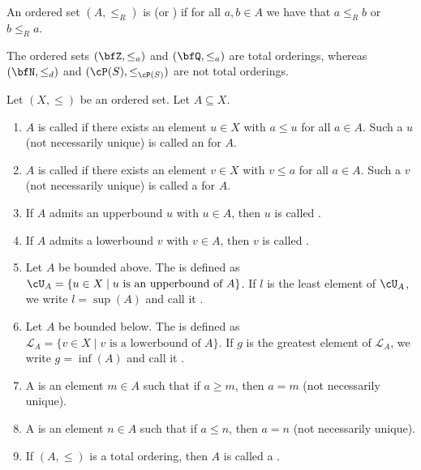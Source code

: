     \begin{definition}
        An ordered set $(A, \leq_R)$ is  (or ) if for all $a,b \in A$ we have that $a \leq_R b$ or $b \leq_R a$.
    \end{definition}

    \begin{example}
        The ordered sets $(\bfZ,\leq_a)$ and $(\bfQ,\leq_a)$ are total orderings, whereas $(\bfN,\leq_d)$ and $(\cP(S),\leq_{\cP(S)})$ are not total orderings.
    \end{example}

    \begin{definition}
        Let $(X,\leq)$ be an ordered set. Let $A \subseteq X$.
        \begin{enumerate}[label = (\arabic*)]
            \item $A$ is called  if there exists an element $u \in X$ with $a \leq u$ for all $a \in A$. Such a $u$ (not necessarily unique) is called an  for $A$.
            \item $A$ is called  if there exists an element $v \in X$ with $v \leq a$ for all $a \in A$. Such a $v$ (not necessarily unique) is called a  for $A$.
            \item If $A$ admits an upperbound $u$ with $u \in A$, then $u$ is called .
            \item If $A$ admits a lowerbound $v$ with $v \in A$, then $v$ is called .
            \item Let $A$ be bounded above. The  is defined as \newline $\cU_A = \{u \in X \mid \text{$u$ is an upperbound of $A$}\}$. If $l$ is the least element of $\cU_A$, we write $l = \sup{(A)}$ and call it .
            \item Let $A$ be bounded below. The  is defined as \newline $\mathscr{L}_A = \{v \in X \mid \text{$v$ is a lowerbound of $A$}\}$. If $g$ is the greatest element of $\mathscr{L}_A$, we write $g = \inf{(A)}$ and call it .
            \item A  is an element $m \in A$ such that if $a \geq m$, then $a = m$ (not necessarily unique).
            \item A  is an element $n \in A$ such that if $a \leq n$, then $a = n$ (not necessarily unique).
            \item If $(A,\leq)$ is a total ordering, then $A$ is called a .
        \end{enumerate}
    \end{definition}

